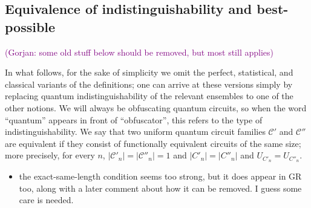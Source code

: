 \documentclass[11pt]{article}
\numberwithin{equation}{section}
\newcommand{\ga}[1]{{ \textcolor{purple}{(Gorjan:  #1)}}{}}
\begin{document}
{%

\subsection{Equivalence of indistinguishability and best-possible}

\ga{some old stuff below should be removed, but most still applies}

In what follows, for the sake of simplicity we omit the perfect, statistical, and classical variants of the definitions; one can arrive at these versions simply by replacing quantum indistinguishability of the relevant ensembles to one of the other notions. We will always be obfuscating quantum circuits, so when the word ``quantum'' appears in front of ``obfuscator'', this refers to the type of indistinguishability. We say that two uniform quantum circuit families $\mathcal C'$ and $\mathcal C''$ are equivalent if they consist of functionally equivalent circuits of the same size; more precisely, for every $n$, $|\mathcal C'_n| = |\mathcal C''_n| = 1$ and $|C'_n| = |C''_n|$  and $U_{C'_n} = U_{C''_n}$.

\begin{itemize}
\item the exact-same-length condition seems too strong, but it does appear in GR too, along with a later comment about how it can be removed. I guess some care is needed.
\end{itemize}

}
\end{document}
